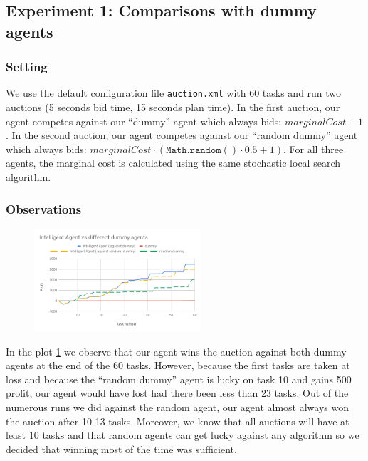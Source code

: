 \documentclass[11pt]{article}
\begin{document}
  \subsection{Experiment 1: Comparisons with dummy agents}


  \subsubsection{Setting}

  
  We use the default configuration file \texttt{auction.xml} with 60 tasks and
  run two auctions (5 seconds bid time, 15 seconds plan time). In the first
  auction, our agent competes against our ``dummy'' agent which always bids:
  $marginalCost + 1$. In the second auction, our agent competes against our
  ``random dummy'' agent which always bids: $marginalCost \cdot
  (\mathtt{Math.random()} \cdot 0.5 + 1)$. For all three agents, the marginal
  cost is calculated using the same stochastic local search algorithm.

  \subsubsection{Observations}


  \begin{figure}[htbp] 
	\centering
	\includegraphics[width=0.55\textwidth]{dummy.png}
	\label{fig1}
  \end{figure}


  In the plot \ref{fig1} we observe that our agent wins the auction against both dummy
  agents at the end of the 60 tasks. However, because the first tasks are taken
  at loss and because the ``random dummy'' agent is lucky on task 10 and gains
  500 profit, our agent would have lost had there been less than 23 tasks. Out
  of the numerous runs we did against the random agent, our agent almost always
  won the auction after 10-13 tasks. Moreover, we know that all auctions will
  have at least 10 tasks and that random agents can get lucky against any
  algorithm so we decided that winning most of the time was sufficient.
\end{document}
